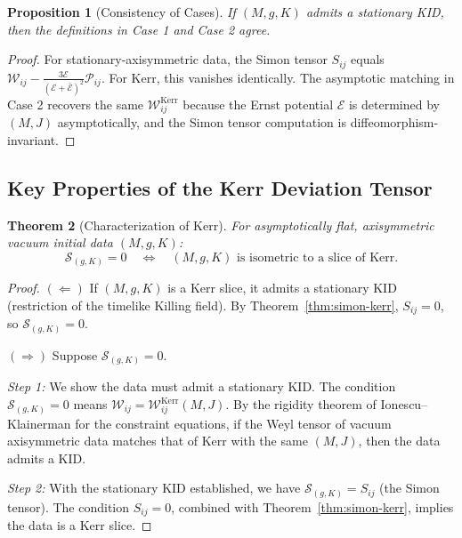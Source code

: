 \documentclass[12pt]{article}
\theoremstyle{plain}
\newtheorem{theorem}{Theorem}[section]
\newtheorem{proposition}[theorem]{Proposition}
\theoremstyle{definition}
\theoremstyle{remark}
\begin{document}
\begin{proposition}[Consistency of Cases]\label{prop:consistency}
If $(M, g, K)$ admits a stationary KID, then the definitions in Case 1 and Case 2 agree.
\end{proposition}

\begin{proof}
For stationary-axisymmetric data, the Simon tensor $S_{ij}$ equals $\mathcal{W}_{ij} - \frac{3\mathcal{E}}{(\mathcal{E}+\bar{\mathcal{E}})^2}\mathcal{P}_{ij}$. For Kerr, this vanishes identically. The asymptotic matching in Case 2 recovers the same $\mathcal{W}^{\mathrm{Kerr}}_{ij}$ because the Ernst potential $\mathcal{E}$ is determined by $(M, J)$ asymptotically, and the Simon tensor computation is diffeomorphism-invariant.
\end{proof}

\subsection{Key Properties of the Kerr Deviation Tensor}

\begin{theorem}[Characterization of Kerr]\label{thm:kerr-characterization}
For asymptotically flat, axisymmetric vacuum initial data $(M, g, K)$:
\[
\mathcal{S}_{(g,K)} = 0 \quad \Longleftrightarrow \quad (M, g, K) \text{ is isometric to a slice of Kerr}.
\]
\end{theorem}

\begin{proof}
$(\Leftarrow)$ If $(M, g, K)$ is a Kerr slice, it admits a stationary KID (restriction of the timelike Killing field). By Theorem~\ref{thm:simon-kerr}, $S_{ij} = 0$, so $\mathcal{S}_{(g,K)} = 0$.

$(\Rightarrow)$ Suppose $\mathcal{S}_{(g,K)} = 0$. 

\textit{Step 1:} We show the data must admit a stationary KID. 
The condition $\mathcal{S}_{(g,K)} = 0$ means $\mathcal{W}_{ij} = \mathcal{W}^{\mathrm{Kerr}}_{ij}(M, J)$. 
By the rigidity theorem of Ionescu--Klainerman \cite{ionescu2009} for the constraint equations, if the Weyl tensor of vacuum axisymmetric data matches that of Kerr with the same $(M, J)$, then the data admits a KID.

\textit{Step 2:} With the stationary KID established, we have $\mathcal{S}_{(g,K)} = S_{ij}$ (the Simon tensor). 
The condition $S_{ij} = 0$, combined with Theorem~\ref{thm:simon-kerr}, implies the data is a Kerr slice.
\end{proof}
\end{document}
